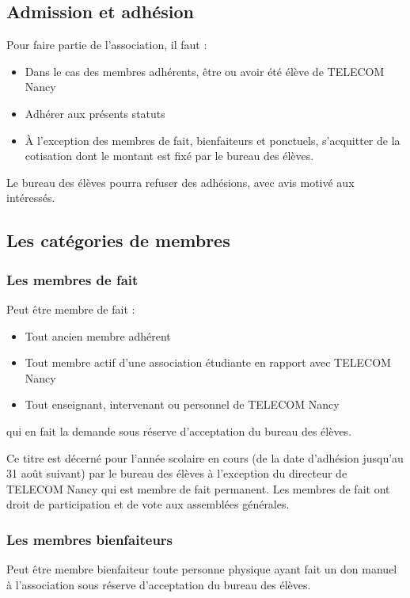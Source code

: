 \documentclass{article}
\begin{document}
		\subsection{Admission et adhésion}
			Pour faire partie de l'association, il faut :
			\begin{itemize}
				\item Dans le cas des membres adhérents, être ou avoir été élève
					de TELECOM Nancy
				\item Adhérer aux présents statuts
				\item À l’exception des membres de fait, bienfaiteurs et
					ponctuels, s'acquitter de la cotisation dont le montant est
					fixé par le bureau des élèves.
			\end{itemize}

			Le bureau des élèves pourra refuser des adhésions, avec avis motivé
			aux intéressés.

		\subsection{Les catégories de membres}
		\label{ssec:categories}
			\subsubsection{Les membres de fait}
				Peut être membre de fait :
				\begin{itemize}
					\item Tout ancien membre adhérent
					\item Tout membre actif d’une association étudiante en
						rapport avec TELECOM Nancy
					\item Tout enseignant, intervenant ou personnel de TELECOM
						Nancy
				\end{itemize}
				qui en fait la demande sous réserve d’acceptation du bureau des
				élèves.

				Ce titre est décerné pour l’année scolaire en cours (de la date
				d’adhésion jusqu’au 31 août suivant) par le bureau des élèves à
				l’exception du directeur de TELECOM Nancy qui est membre de fait
				permanent. Les membres de fait ont droit de participation et de
				vote aux assemblées générales.

			\subsubsection{Les membres bienfaiteurs}
				Peut être membre bienfaiteur toute personne physique ayant fait
				un don manuel à l’association sous réserve d’acceptation du
				bureau des élèves.
\end{document}
